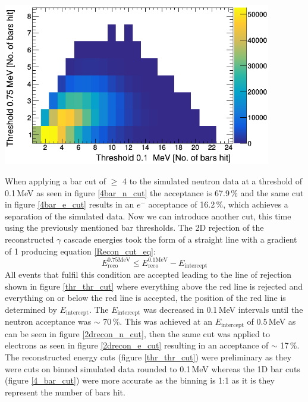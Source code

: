 \documentclass[12pt,a4paper]{article}
\newenvironment{Figure}
  {\par\medskip\noindent\minipage{\linewidth}}
  {\endminipage\par\medskip}
\begin{document}
\begin{Figure}
 \centering
 \includegraphics[height=71mm]{barsHitThr0_1_0_75.png}
 \label{thresholds_bars_hit}
\end{Figure} 

When applying a bar cut of $\geq$ 4 to the simulated neutron data at a threshold of 0.1\,MeV as seen in figure \ref{4bar_n_cut} the acceptance is 67.9\,\% and the same cut in figure \ref{4bar_e_cut} results in an $e^-$ acceptance of 16.2\,\%, which achieves a separation of the simulated data. Now we can introduce another cut, this time using the previously mentioned bar thresholds. The 2D rejection of the reconstructed $\gamma$ cascade energies took the form of a straight line with a gradient of 1 producing equation \ref{Recon_cut_eq}:
\begin{equation}
E_{\textrm{reco}}^{\textrm{0.75MeV}} \leq E_{\textrm{reco}}^{\textrm{0.1MeV}} - E_\textrm{intercept}
\label{Recon_cut_eq}
\end{equation}
All events that fulfil this condition are accepted leading to the line of rejection shown in figure \ref{thr_thr_cut} where everything above the red line is rejected and everything on or below the red line is accepted, the position of the red line is determined by $E_{\textrm{intercept}}$. The $E_\textrm{intercept}$ was decreased in 0.1\,MeV intervals until the neutron acceptance was $\sim$ 70\,\%. This was achieved at an $E_\textrm{intercept}$ of 0.5\,MeV as can be seen in figure \ref{2drecon_n_cut}, then the same cut was applied to electrons as seen in figure \ref{2drecon_e_cut} resulting in an acceptance of $\sim$ 17\,\%. The reconstructed energy cuts (figure \ref{thr_thr_cut}) were preliminary as they were cuts on binned simulated data rounded to 0.1\,MeV whereas the 1D bar cuts (figure \ref{4_bar_cut}) were more accurate as the binning is 1:1 as it is they represent the number of bars hit. 
\end{document}
